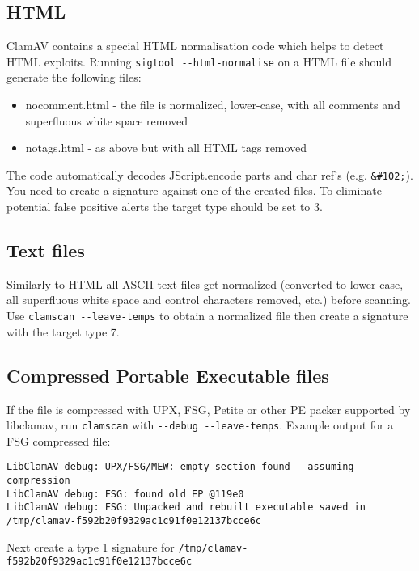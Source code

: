 \documentclass[a4paper,titlepage,12pt]{article}
\begin{document}
    \subsection{HTML}
    ClamAV contains a special HTML normalisation code which helps to detect
    HTML exploits. Running \verb+sigtool --html-normalise+ on a HTML file
    should generate the following files:
    \begin{itemize}
	\item nocomment.html - the file is normalized, lower-case, with all
	comments and superfluous white space removed
	\item notags.html - as above but with all HTML tags removed
    \end{itemize}
    The code automatically decodes JScript.encode parts and char ref's (e.g.
    \verb+&#102;+). You need to create a signature against one of the created
    files. To eliminate potential false positive alerts the target type should
    be set to 3.

    \subsection{Text files}
    Similarly to HTML all ASCII text files get normalized (converted
    to lower-case, all superfluous white space and control characters removed,
    etc.) before scanning. Use \verb+clamscan --leave-temps+ to obtain
    a normalized file then create a signature with the target type 7.

    \subsection{Compressed Portable Executable files}
    If the file is compressed with UPX, FSG, Petite or other PE packer
    supported by libclamav, run \verb+clamscan+ with
    \verb+--debug --leave-temps+. Example output for a FSG compressed file:
    \begin{verbatim}
LibClamAV debug: UPX/FSG/MEW: empty section found - assuming compression
LibClamAV debug: FSG: found old EP @119e0
LibClamAV debug: FSG: Unpacked and rebuilt executable saved in
/tmp/clamav-f592b20f9329ac1c91f0e12137bcce6c
    \end{verbatim}
    Next create a type 1 signature for \verb+/tmp/clamav-f592b20f9329ac1c91f0e12137bcce6c+
\end{document}
